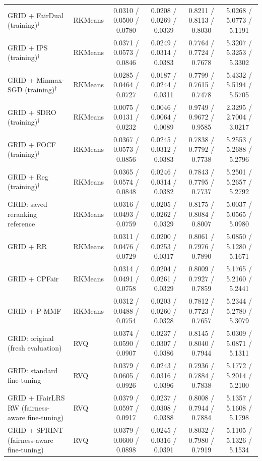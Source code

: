 \begin{table}[p]
{\begin{tabular}{llcccc}
GRID + FairDual (training)$^{\dagger}$ & RKMeans & 0.0310 / 0.0500 / 0.0780 & 0.0208 / 0.0269 / 0.0339 & 0.8211 / 0.8113 / 0.8030 & 5.0268 / 5.0773 / 5.1191 \\
GRID + IPS (training)$^{\dagger}$ & RKMeans & 0.0371 / 0.0573 / 0.0846 & 0.0249 / 0.0314 / 0.0383 & 0.7764 / 0.7724 / 0.7678 & 5.3207 / 5.3253 / 5.3302 \\
GRID + Minmax-SGD (training)$^{\dagger}$ & RKMeans & 0.0285 / 0.0464 / 0.0727 & 0.0187 / 0.0244 / 0.0311 & 0.7799 / 0.7615 / 0.7478 & 5.4332 / 5.5194 / 5.5705 \\
GRID + SDRO (training)$^{\dagger}$ & RKMeans & 0.0075 / 0.0131 / 0.0232 & 0.0046 / 0.0064 / 0.0089 & 0.9749 / 0.9672 / 0.9585 & 2.3295 / 2.7004 / 3.0217 \\
GRID + FOCF (training)$^{\dagger}$ & RKMeans & 0.0367 / 0.0573 / 0.0856 & 0.0245 / 0.0312 / 0.0383 & 0.7838 / 0.7792 / 0.7738 & 5.2553 / 5.2688 / 5.2796 \\
GRID + Reg (training)$^{\dagger}$ & RKMeans & 0.0365 / 0.0574 / 0.0848 & 0.0246 / 0.0314 / 0.0382 & 0.7843 / 0.7795 / 0.7737 & 5.2501 / 5.2657 / 5.2792 \\
GRID: saved reranking reference & RKMeans & 0.0316 / 0.0493 / 0.0759 & 0.0205 / 0.0262 / 0.0329 & 0.8175 / 0.8084 / 0.8007 & 5.0037 / 5.0565 / 5.0980 \\
GRID + RR & RKMeans & 0.0311 / 0.0476 / 0.0729 & 0.0200 / 0.0253 / 0.0317 & 0.8061 / 0.7976 / 0.7890 & 5.0850 / 5.1280 / 5.1671 \\
GRID + CPFair & RKMeans & 0.0314 / 0.0491 / 0.0758 & 0.0204 / 0.0261 / 0.0329 & 0.8009 / 0.7927 / 0.7859 & 5.1765 / 5.2160 / 5.2441 \\
GRID + P-MMF & RKMeans & 0.0312 / 0.0488 / 0.0754 & 0.0203 / 0.0260 / 0.0328 & 0.7812 / 0.7723 / 0.7657 & 5.2344 / 5.2780 / 5.3079 \\
\midrule
GRID: original (fresh evaluation) & RVQ & 0.0374 / 0.0590 / 0.0907 & 0.0237 / 0.0307 / 0.0386 & 0.8145 / 0.8040 / 0.7944 & 5.0309 / 5.0871 / 5.1311 \\
GRID: standard fine-tuning & RVQ & 0.0379 / 0.0605 / 0.0926 & 0.0243 / 0.0316 / 0.0396 & 0.7936 / 0.7884 / 0.7838 & 5.1772 / 5.2014 / 5.2100 \\
GRID + IFairLRS RW (fairness-aware fine-tuning) & RVQ & 0.0379 / 0.0597 / 0.0917 & 0.0237 / 0.0308 / 0.0388 & 0.8008 / 0.7944 / 0.7884 & 5.1357 / 5.1608 / 5.1798 \\
GRID + SPRINT (fairness-aware fine-tuning) & RVQ & 0.0379 / 0.0600 / 0.0898 & 0.0245 / 0.0316 / 0.0391 & 0.8032 / 0.7980 / 0.7919 & 5.1105 / 5.1326 / 5.1534 \\

\end{tabular}}
\end{table}
